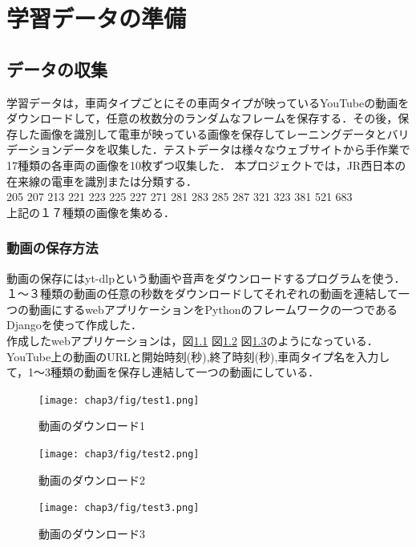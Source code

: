 

\chapter{学習データの準備}\label{genri}

\section{データの収集}
学習データは，車両タイプごとにその車両タイプが映っているYouTubeの動画をダウンロードして，任意の枚数分のランダムなフレームを保存する．その後，保存した画像を識別して電車が映っている画像を保存してレーニングデータとバリデーションデータを収集した．テストデータは様々なウェブサイトから手作業で17種類の各車両の画像を10枚ずつ収集した．
本プロジェクトでは，JR西日本の在来線の電車を識別または分類する．\\
205  207  213  221  223  225  227  271  281  283  285  287  321  323  381  521  683 \\
上記の１７種類の画像を集める．
\subsection{動画の保存方法}
動画の保存にはyt-dlpという動画や音声をダウンロードするプログラムを使う．
１〜３種類の動画の任意の秒数をダウンロードしてそれぞれの動画を連結して一つの動画にするwebアプリケーションをPythonのフレームワークの一つであるDjangoを使って作成した．\\
	作成したwebアプリケーションは，図\ref{test1} 図\ref{test2}  図\ref{test3}のようになっている．
	YouTube上の動画のURLと開始時刻(秒),終了時刻(秒),車両タイプ名を入力して，1〜3種類の動画を保存し連結して一つの動画にしている．
	
\begin{figure}[H]
	\centering
	\texttt{[image: chap3/fig/test1.png]}
	\caption{動画のダウンロード1}
	\label{test1}
\end{figure}
\begin{figure}[H]
	\texttt{[image: chap3/fig/test2.png]}
	\caption{動画のダウンロード2}
	\label{test2}
\end{figure}
\begin{figure}[H]
	\texttt{[image: chap3/fig/test3.png]}
	\caption{動画のダウンロード3}
	\label{test3}
\end{figure}

